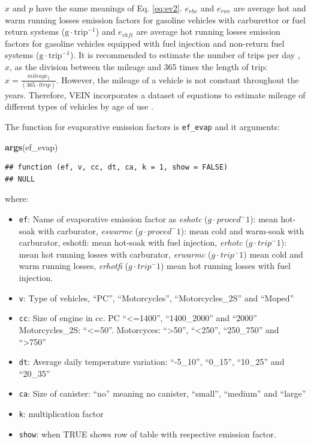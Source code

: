 \documentclass[12pt,graybox,envcountchap,sectrefs]{krantz}
\makeatletter
\newenvironment{Shaded}{\begin{snugshade}}{\end{snugshade}}
\newcommand{\KeywordTok}[1]{\textcolor[rgb]{0.13,0.29,0.53}{\textbf{#1}}}
\newcommand{\NormalTok}[1]{#1}
\newenvironment{kframe}{%
\medskip{}
\setlength{\fboxsep}{.8em}
 \def\at@end@of@kframe{}%
 \ifinner\ifhmode%
  \def\at@end@of@kframe{\end{minipage}}%
  \begin{minipage}{\columnwidth}%
 \fi\fi%
 \def\FrameCommand##1{\hskip\@totalleftmargin \hskip-\fboxsep
 \colorbox{shadecolor}{##1}\hskip-\fboxsep
     \hskip-\linewidth \hskip-\@totalleftmargin \hskip\columnwidth}%
 \MakeFramed {\advance\hsize-\width
   \@totalleftmargin\z@ \linewidth\hsize
   \@setminipage}}%
 {\par\unskip\endMakeFramed%
 \at@end@of@kframe}
\renewenvironment{Shaded}{\begin{kframe}}{\end{kframe}}
\theoremstyle{definition}
\theoremstyle{definition}
\theoremstyle{definition}
\theoremstyle{remark}
\makeatother
\begin{document}
\(x\) and \(p\) have the same meanings of Eq. \eqref{eq:ev2}. \(e_{rhc}\)
and \(e_{rwc}\) are average hot and warm running losses emission factors
for gasoline vehicles with carburettor or fuel return systems
(\(\mathrm{g \cdot trip^{-1}}\)) and \(e_{rhfi}\) are average hot
running losses emission factors for gasoline vehicles equipped with fuel
injection and non-return fuel systems (\(\mathrm{g \cdot trip^{-1}}\)).
It is recommended to estimate the number of trips per day
\citep{MelliosNtziachristos2016}, \(x\), as the division between the
mileage and 365 times the length of trip:
\(x = \frac{mileage_j}{(365 \cdot ltrip)}\). However, the mileage of a
vehicle is not constant throughout the years. Therefore, VEIN
incorporates a dataset of equations to estimate mileage of different
types of vehicles by age of use \citep{BruniBales2013}.

The function for evaporative emission factors is \texttt{ef\_evap} and
it arguments:

\begin{Shaded}
\begin{Highlighting}[]
\KeywordTok{args}\NormalTok{(ef_evap)}
\end{Highlighting}
\end{Shaded}

\begin{verbatim}
## function (ef, v, cc, dt, ca, k = 1, show = FALSE) 
## NULL
\end{verbatim}

where:

\begin{itemize}
\item
  \texttt{ef}: Name of evaporative emission factor as \emph{eshotc}
  (\(g \cdot proced^-1\)): mean hot-soak with carburator, \emph{eswarmc}
  (\(g \cdot proced^-1\)): mean cold and warm-soak with carburator,
  eshotfi: mean hot-soak with fuel injection, \emph{erhotc}
  (\(g \cdot trip^-1\)): mean hot running losses with carburator,
  \emph{erwarmc} (\(g \cdot trip^-1\)) mean cold and warm running
  losses, \emph{erhotfi} (\(g \cdot trip^-1\)) mean hot running losses
  with fuel injection.
\item
  \texttt{v}: Type of vehicles, ``PC'', ``Motorcycles'',
  ``Motorcycles\_2S'' and ``Moped''
\item
  \texttt{cc}: Size of engine in cc. PC ``\textless{}=1400'',
  ``1400\_2000'' and ``2000'' Motorcycles\_2S: ``\textless{}=50''.
  Motorcyces: ``\textgreater{}50'', ``\textless{}250'', ``250\_750'' and
  ``\textgreater{}750''
\item
  \texttt{dt}: Average daily temperature variation: ``-5\_10'',
  ``0\_15'', ``10\_25'' and ``20\_35''
\item
  \texttt{ca}: Size of canister: ``no'' meaning no canister, ``small'',
  ``medium'' and ``large''
\item
  \texttt{k}: multiplication factor
\item
  \texttt{show}: when TRUE shows row of table with respective emission
  factor.
\end{itemize}
\end{document}
